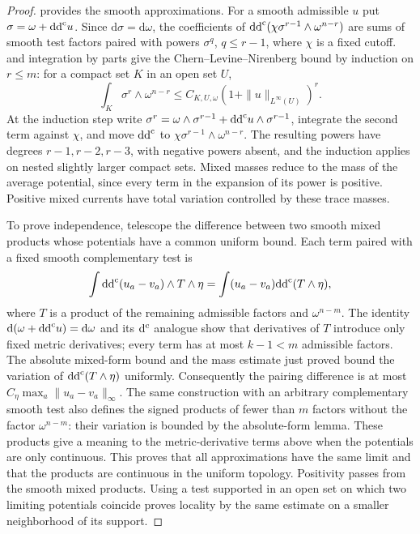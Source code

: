 \begin{proof}
 provides the smooth
approximations. For a smooth admissible $u$ put $\sigma=\omega+\mathrm{dd}^{\mathrm{c}} u$.
Since $\mathrm d\sigma=\mathrm d\omega$, the coefficients of
$\mathrm{dd}^{\mathrm{c}}(\chi\sigma^{r-1}\wedge\omega^{n-r})$ are sums of smooth test
factors paired with powers $\sigma^q$, $q\leq r-1$, where $\chi$ is a
fixed cutoff.  and integration by
parts give the Chern--Levine--Nirenberg bound by induction on $r\leq m$:
for a compact set $K$ in an open set $U$,
\[
 \int_K\sigma^r\wedge\omega^{n-r}
                     \leq C_{K,U,\omega}(1+\|u\|_{L^\infty(U)})^r.
\]
At the induction step write $\sigma^r=\omega\wedge\sigma^{r-1}
+\mathrm{dd}^{\mathrm{c}} u\wedge\sigma^{r-1}$, integrate the second term against $\chi$,
and move $\mathrm{dd}^{\mathrm{c}}$ to $\chi\sigma^{r-1}\wedge\omega^{n-r}$.
The resulting powers have degrees $r-1,r-2,r-3$, with negative powers absent, and the induction
applies on nested slightly larger compact sets. Mixed masses reduce to
the mass of the average potential, since every term in the expansion of
its power is positive. Positive mixed currents have total variation
controlled by these trace masses.

To prove independence, telescope the difference between two smooth
mixed products whose potentials have a common uniform bound. Each term
paired with a fixed smooth complementary test is
\[
 \int\mathrm{dd}^{\mathrm{c}}(u_a-v_a)\wedge T\wedge\eta
                         =\int(u_a-v_a)\mathrm{dd}^{\mathrm{c}}(T\wedge\eta),
\]
where $T$ is a product of the remaining admissible factors and
$\omega^{n-m}$. The identity $\mathrm d(\omega+\mathrm{dd}^{\mathrm{c}} u)=\mathrm d\omega$
and its $\mathrm d^{\mathrm c}$ analogue show that derivatives of $T$ introduce only
fixed metric derivatives; every term has at most $k-1<m$ admissible
factors. The absolute mixed-form bound and the mass estimate just
proved bound the variation of $\mathrm{dd}^{\mathrm{c}}(T\wedge\eta)$ uniformly.
Consequently the pairing difference is at most
$C_\eta\max_a\|u_a-v_a\|_\infty$.
The same construction with an arbitrary complementary smooth test
also defines the signed products of fewer than $m$ factors without the
factor $\omega^{n-m}$: their variation is bounded by the absolute-form
lemma. These products give a meaning to the metric-derivative terms
above when the potentials are only continuous.
This proves that all approximations have the same limit and that the
products are continuous in the uniform topology. Positivity passes
from the smooth mixed products. Using a test supported in an open set
on which two limiting potentials coincide proves locality by the same
estimate on a smaller neighborhood of its support.
\end{proof}

